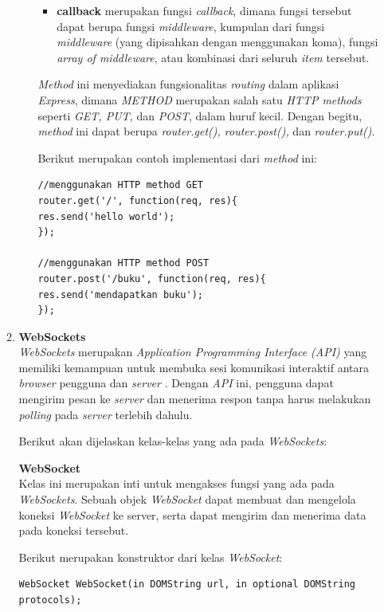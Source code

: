 \documentclass[a4paper,twoside]{article}
\begin{document}
\begin{enumerate}
\begin{enumerate}
\begin{itemize}
\begin{itemize}
					\item \textbf{callback} merupakan fungsi \textit{callback}, dimana fungsi tersebut dapat berupa fungsi \textit{middleware}, kumpulan dari fungsi \textit{middleware} (yang dipisahkan dengan menggunakan koma), fungsi \textit{array of middleware}, atau kombinasi dari seluruh \textit{item} tersebut.
				\end{itemize}
				
				\textit{Method} ini menyediakan fungsionalitas \textit{routing} dalam aplikasi \textit{Express}, dimana \textit{METHOD} merupakan salah satu \textit{HTTP methods} seperti \textit{GET, PUT, } dan \textit{POST}, dalam huruf kecil. Dengan begitu, \textit{method} ini dapat berupa \textit{router.get(), router.post(),} dan \textit{router.put()}.
				
				Berikut merupakan contoh implementasi dari \textit{method} ini:
\begin{lstlisting}
//menggunakan HTTP method GET
router.get('/', function(req, res){
res.send('hello world');
});
				
//menggunakan HTTP method POST
router.post('/buku', function(req, res){
res.send('mendapatkan buku');
});
\end{lstlisting}
				
			\end{itemize}
			
			
			\item \textbf{WebSockets} \\
			\textit{WebSockets} merupakan \textit{Application Programming Interface (API)} yang memiliki kemampuan untuk membuka sesi komunikasi interaktif antara \textit{browser} pengguna dan \textit{server} \cite{websockets}. Dengan \textit{API} ini, pengguna dapat mengirim pesan ke \textit{server} dan menerima respon tanpa harus melakukan \textit{polling} pada \textit{server} terlebih dahulu.
			
			Berikut akan dijelaskan kelas-kelas yang ada pada \textit{WebSockets}:
			
			\textbf{WebSocket} \\
			Kelas ini merupakan inti untuk mengakses fungsi yang ada pada \textit{WebSockets}. Sebuah objek \textit{WebSocket} dapat membuat dan mengelola koneksi \textit{WebSocket} ke server, serta dapat mengirim dan menerima data pada koneksi tersebut.
			
			Berikut merupakan konstruktor dari kelas \textit{WebSocket}: 
\begin{lstlisting}
WebSocket WebSocket(in DOMString url, in optional DOMString protocols);
\end{lstlisting}
			

\end{enumerate}
\end{enumerate}
\end{document}
